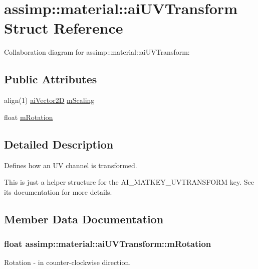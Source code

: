 \hypertarget{structassimp_1_1material_1_1ai_u_v_transform}{\section{assimp\+:\+:material\+:\+:ai\+U\+V\+Transform Struct Reference}
\label{structassimp_1_1material_1_1ai_u_v_transform}
}


Collaboration diagram for assimp\+:\+:material\+:\+:ai\+U\+V\+Transform\+:
\subsection*{Public Attributes}
\begin{DoxyCompactItemize}
\item 
align(1) \hyperlink{structai_vector2_d}{ai\+Vector2\+D} \hyperlink{structassimp_1_1material_1_1ai_u_v_transform_a402c62fd99c783a4acd78a37e9de7700}{m\+Scaling}
\item 
float \hyperlink{structassimp_1_1material_1_1ai_u_v_transform_ab6d58d36027f77f9450eba9653a48870}{m\+Rotation}
\end{DoxyCompactItemize}


\subsection{Detailed Description}
Defines how an U\+V channel is transformed.

This is just a helper structure for the {\ttfamily A\+I\+\_\+\+M\+A\+T\+K\+E\+Y\+\_\+\+U\+V\+T\+R\+A\+N\+S\+F\+O\+R\+M} key. See its documentation for more details. 

\subsection{Member Data Documentation}
\hypertarget{structassimp_1_1material_1_1ai_u_v_transform_ab6d58d36027f77f9450eba9653a48870}{
\subsubsection[{m\+Rotation}]{\setlength{\rightskip}{0pt plus 5cm}float assimp\+::material\+::ai\+U\+V\+Transform\+::m\+Rotation}}\label{structassimp_1_1material_1_1ai_u_v_transform_ab6d58d36027f77f9450eba9653a48870}
Rotation -\/ in counter-\/clockwise direction.

